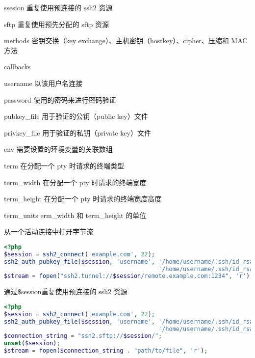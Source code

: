 \begin{compactitem}
\item ssesion 重复使用预连接的 ssh2 资源

\item sftp 重复使用预先分配的 sftp 资源


\item methods 密钥交换（key exchange）、主机密钥（hostkey）、cipher、压缩和 MAC 方法

\item callbacks

\item username 以该用户名连接

\item password 使用的密码来进行密码验证

\item pubkey\_file 用于验证的公钥（public key）文件

\item privkey\_file 用于验证的私钥（private key）文件

\item env 需要设置的环境变量的关联数组

\item term 在分配一个 pty 时请求的终端类型

\item term\_width 在分配一个 pty 时请求的终端宽度


\item term\_height 在分配一个 pty 时请求的终端宽度高度

\item term\_units erm\_width 和 term\_height 的单位

\end{compactitem}

\begin{example}
从一个活动连接中打开字节流
\begin{lstlisting}[language=PHP]
<?php
$session = ssh2_connect('example.com', 22);
ssh2_auth_pubkey_file($session, 'username', '/home/username/.ssh/id_rsa.pub',
                                            '/home/username/.ssh/id_rsa', 'secret');
$stream = fopen("ssh2.tunnel://$session/remote.example.com:1234", 'r');
\end{lstlisting}
\end{example}



\begin{example}
通过\$session重复使用预连接的 ssh2 资源
\begin{lstlisting}[language=PHP]
<?php
$session = ssh2_connect('example.com', 22);
ssh2_auth_pubkey_file($session, 'username', '/home/username/.ssh/id_rsa.pub',
                                            '/home/username/.ssh/id_rsa', 'secret');
$connection_string = "ssh2.sftp://$session/";
unset($session);
$stream = fopen($connection_string . "path/to/file", 'r');
\end{lstlisting}
\end{example}

